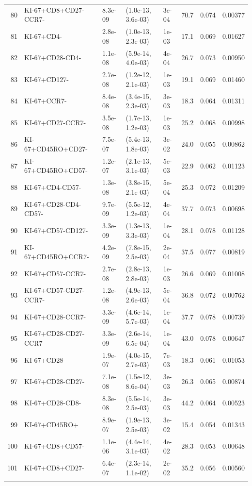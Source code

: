 \begin{landscape}
\begin{center}
{\begin{longtable}{rlllllll}
      80 & KI-67+CD8+CD27-CCR7- & 8.3e-09 & (1.0e-13, 3.6e-03) & 3e-04 &  70.7 & 0.074 & 0.00377 \\ 
      81 & KI-67+CD4- & 2.8e-08 & (1.0e-13, 2.3e-03) & 1e-03 &  17.1 & 0.069 & 0.01627 \\ 
      82 & KI-67+CD28-CD4- & 1.1e-08 & (5.9e-14, 4.0e-03) & 4e-04 &  26.7 & 0.073 & 0.00950 \\ 
      83 & KI-67+CD127- & 2.7e-08 & (1.2e-12, 2.1e-03) & 1e-03 &  19.1 & 0.069 & 0.01460 \\ 
      84 & KI-67+CCR7- & 8.4e-08 & (3.4e-15, 2.3e-03) & 3e-03 &  18.3 & 0.064 & 0.01311 \\ 
      85 & KI-67+CD27-CCR7- & 3.5e-08 & (1.7e-13, 1.2e-03) & 1e-03 &  25.2 & 0.068 & 0.00998 \\ 
      86 & KI-67+CD45RO+CD27- & 7.5e-07 & (5.4e-13, 1.8e-03) & 3e-02 &  24.0 & 0.055 & 0.00862 \\ 
      87 & KI-67+CD45RO+CD57- & 1.2e-07 & (2.1e-13, 3.1e-03) & 5e-03 &  22.9 & 0.062 & 0.01123 \\ 
      88 & KI-67+CD4-CD57- & 1.3e-08 & (3.8e-15, 2.1e-03) & 5e-04 &  25.3 & 0.072 & 0.01209 \\ 
      89 & KI-67+CD28-CD4-CD57- & 9.7e-09 & (5.5e-12, 1.2e-03) & 4e-04 &  37.7 & 0.073 & 0.00698 \\ 
      90 & KI-67+CD57-CD127- & 3.3e-09 & (1.3e-13, 3.3e-03) & 1e-04 &  28.1 & 0.078 & 0.01128 \\ 
      91 & KI-67+CD45RO+CCR7- & 4.2e-09 & (7.8e-15, 2.5e-03) & 2e-04 &  37.5 & 0.077 & 0.00819 \\ 
      92 & KI-67+CD57-CCR7- & 2.7e-08 & (2.8e-13, 2.8e-03) & 1e-03 &  26.6 & 0.069 & 0.01008 \\ 
      93 & KI-67+CD57-CD27-CCR7- & 1.2e-08 & (4.9e-13, 2.6e-03) & 5e-04 &  36.8 & 0.072 & 0.00762 \\ 
      94 & KI-67+CD28-CCR7- & 3.3e-09 & (4.6e-14, 5.7e-03) & 1e-04 &  37.7 & 0.078 & 0.00739 \\ 
      95 & KI-67+CD28-CD27-CCR7- & 3.3e-09 & (2.6e-14, 6.5e-04) & 1e-04 &  43.0 & 0.078 & 0.00647 \\ 
      96 & KI-67+CD28- & 1.9e-07 & (4.0e-15, 2.7e-03) & 7e-03 &  18.3 & 0.061 & 0.01053 \\ 
      97 & KI-67+CD28-CD27- & 7.1e-08 & (1.5e-12, 8.6e-04) & 3e-03 &  26.3 & 0.065 & 0.00874 \\ 
      98 & KI-67+CD28-CD8- & 8.3e-08 & (5.5e-14, 2.5e-03) & 3e-03 &  44.2 & 0.064 & 0.00523 \\ 
      99 & KI-67+CD45RO+ & 8.9e-07 & (1.9e-13, 2.5e-03) & 3e-02 &  15.4 & 0.054 & 0.01343 \\ 
      100 & KI-67+CD8+CD57- & 1.1e-06 & (4.4e-14, 3.1e-03) & 4e-02 &  28.3 & 0.053 & 0.00648 \\ 
      101 & KI-67+CD8+CD27- & 6.4e-07 & (2.3e-14, 1.1e-02) & 2e-02 &  35.2 & 0.056 & 0.00560 \\ 
      \hline
      \label{ts1}
    \end{longtable}
  }
\end{center}
\end{landscape}

